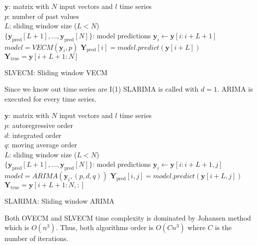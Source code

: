 \begin{algorithm}[ht]
\begin{algorithmic}[1]
\REQUIRE $\,$ \\
$\mathbf{y}$: matrix with $N$ input vectors and $l$ time series\\
$p$: number of past values \\
$L$: sliding window size ($L<N$) \\
\ENSURE  $\,$ \\
$\{ \mathbf{y}_{\text{pred}}[L+1],\dots,\mathbf{y}_{\text{pred}}[N]\}$: model predictions 
    \STATE $\mathbf{y}_i \gets \mathbf{y}[i:i+L+1]$
        \STATE $model = VECM(\mathbf{y}_i, p)$
        \STATE $\mathbf{Y}_{\text{pred}}[i] = model.predict(\mathbf{y}[i+L])$
\ENDFOR
\STATE $\mathbf{Y}_{\text{true}} = \mathbf{y}[i+L+1:N] $
\end{algorithmic}
\caption{SLVECM: Sliding window VECM}
\label{alg:SLVECM}
\end{algorithm}

Since we know out time series are I(1) SLARIMA is called with $d=1$. ARIMA is
executed for every time series. 

\begin{algorithm}[ht]
\begin{algorithmic}[1]
\REQUIRE $\,$ \\
$\mathbf{y}$: matrix with $N$ input vectors and $l$ time series\\
$p$: autoregressive order \\
$d$: integrated order\\
$q$: moving average order\\
$L$: sliding window size ($L<N$) \\
\ENSURE  $\,$ \\
$\{ \mathbf{y}_{\text{pred}}[L+1],\dots,\mathbf{y}_{\text{pred}}[N]\}$: model predictions 
    \STATE $\mathbf{y}_i \gets \mathbf{y}[i:i+L+1,j]$
        \STATE $model = ARIMA(\mathbf{y}_i, (p,d,q))$
        \STATE $\mathbf{Y}_{\text{pred}}[i,j] = model.predict(\mathbf{y}[i+L,j])$
\ENDFOR
\ENDFOR
\STATE $\mathbf{Y}_{\text{true}} = \mathbf{y}[i+L+1:N,:] $
\end{algorithmic}
\caption{SLARIMA: Sliding window ARIMA}
\label{alg:SLARIMA}
\end{algorithm}

Both OVECM and SLVECM time complexity is dominated by Johansen method which is
$O(n^3)$. Thus, both algorithms order is $O(Cn^3)$ where $C$ is the number of
iterations. 


